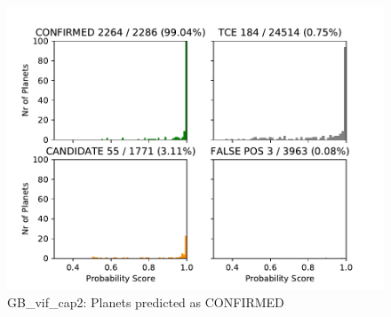 
\begin{figure}[H]
                \centering
                \includegraphics[width = 1\textwidth,height=.4\textheight]{data/GB_vif_cap2_pred_confirm.pdf}
                \caption{GB_vif_cap2: Planets predicted as CONFIRMED}
                \label{fig:data/GB_vif_cap2_pred_confirm}
                \end{figure}
